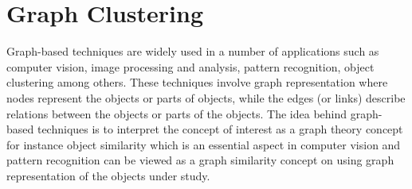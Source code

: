 \documentclass[10pt,a4paper]{article}
\begin{document}
 
 \newpage
\section{Graph Clustering}

Graph-based techniques are widely used in a number of applications such as computer vision,  image processing and analysis, pattern recognition, object clustering among others. These techniques involve graph representation where nodes represent the objects or parts of objects, while the edges (or links) describe relations between the objects or parts of the objects. The idea behind graph-based techniques is to interpret the concept of interest as a graph theory concept for instance object similarity which is an essential aspect in computer vision and pattern recognition can be viewed as a graph similarity concept on using graph representation of the objects under study.
\end{document}
